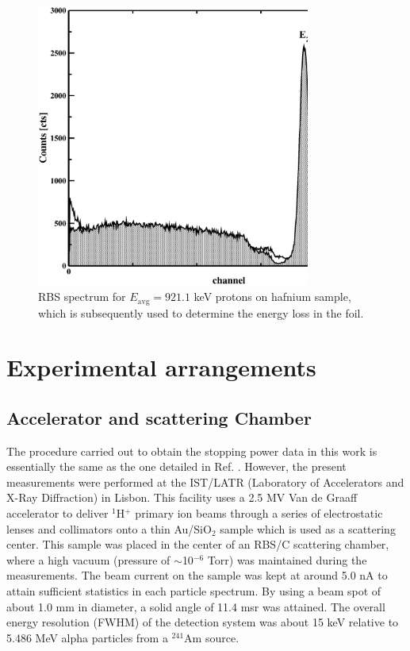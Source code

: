 \documentclass[aps,prb,reprint,groupedaddress]{revtex4-1}
\begin{document}
\begin{figure}[!t]
\centering
\includegraphics[width=9cm]{Fig01.eps}
\caption{RBS spectrum for $E_{\mathrm{avg}} = 921.1$ keV protons on hafnium sample, which is subsequently used to determine the energy loss in the foil.}
\label{F01}
\end{figure}


\section{Experimental arrangements}
\label{experiment}
\subsection{Accelerator and scattering Chamber}
The procedure carried out to obtain the stopping power data in this work is essentially the same as the one detailed in Ref. \cite{Miranda01}. However, the present measurements were performed at the IST/LATR (Laboratory of Accelerators and X-Ray Diffraction) in Lisbon. This facility uses a 2.5 MV Van de Graaff accelerator to deliver $^1$H$^+$ primary ion beams through a series of electrostatic lenses and collimators onto a thin Au/SiO$_2$ sample which is used as a scattering center. This sample was placed in the center of an RBS/C scattering chamber, where a high vacuum (pressure of $\sim$10$^{-6}$ Torr) was maintained during the measurements. The beam current on the sample was kept at around 5.0 nA to attain sufficient statistics in each particle spectrum. 
By using a beam spot of about 1.0 mm in diameter, a solid angle of 11.4 msr was attained. The overall energy resolution (FWHM) of the detection system was about 15 keV relative to 5.486 MeV alpha particles from a $^{241}$Am source.
\end{document}
